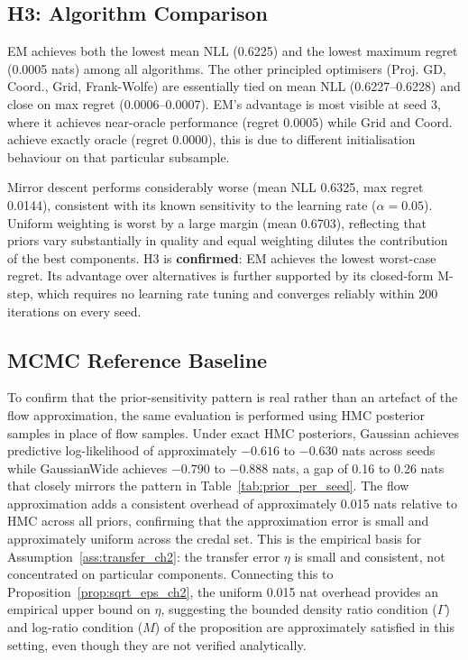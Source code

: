 \subsection{H3: Algorithm Comparison}
\label{sec:h3}

EM achieves both the lowest mean NLL 
(0.6225) and the lowest maximum regret 
(0.0005 nats) among all algorithms. 
The other principled optimisers (Proj. 
GD, Coord., Grid, Frank-Wolfe) are 
essentially tied on mean NLL (0.6227--0.6228) 
and close on max regret (0.0006--0.0007). 
EM's advantage is most visible at 
seed 3, where it achieves near-oracle 
performance (regret 0.0005) while 
Grid and Coord. achieve exactly oracle 
(regret 0.0000), this is due to 
different initialisation behaviour 
on that particular subsample.

Mirror descent performs considerably 
worse (mean NLL 0.6325, max regret 
0.0144), consistent with its known 
sensitivity to the learning rate 
($\alpha = 0.05$). Uniform weighting 
is worst by a large margin (mean 
0.6703), reflecting that priors 
vary substantially in quality and 
equal weighting dilutes the 
contribution of the best components. 
H3 is \textbf{confirmed}: EM achieves 
the lowest worst-case regret. Its 
advantage over alternatives is further 
supported by its closed-form M-step, 
which requires no learning rate 
tuning and converges reliably within 
200 iterations on every seed.

\subsection{MCMC Reference Baseline}

To confirm that the prior-sensitivity 
pattern is real rather than an 
artefact of the flow approximation, 
the same evaluation is performed 
using HMC posterior samples in place 
of flow samples. Under exact HMC 
posteriors, Gaussian achieves 
predictive log-likelihood of 
approximately $-0.616$ to $-0.630$ 
nats across seeds while GaussianWide 
achieves $-0.790$ to $-0.888$ nats, 
a gap of 0.16 to 0.26 nats that 
closely mirrors the pattern in 
Table~\ref{tab:prior_per_seed}. The 
flow approximation adds a consistent 
overhead of approximately 0.015 nats 
relative to HMC across all priors, 
confirming that the approximation 
error is small and approximately 
uniform across the credal set. This 
is the empirical basis for 
Assumption~\ref{ass:transfer_ch2}: 
the transfer error $\eta$ is small 
and consistent, not concentrated 
on particular components. Connecting 
this to Proposition~\ref{prop:sqrt_eps_ch2}, 
the uniform 0.015 nat overhead 
provides an empirical upper bound 
on $\eta$, suggesting the bounded 
density ratio condition ($\Gamma$) 
and log-ratio condition ($M$) of 
the proposition are approximately 
satisfied in this setting, even 
though they are not verified 
analytically.

